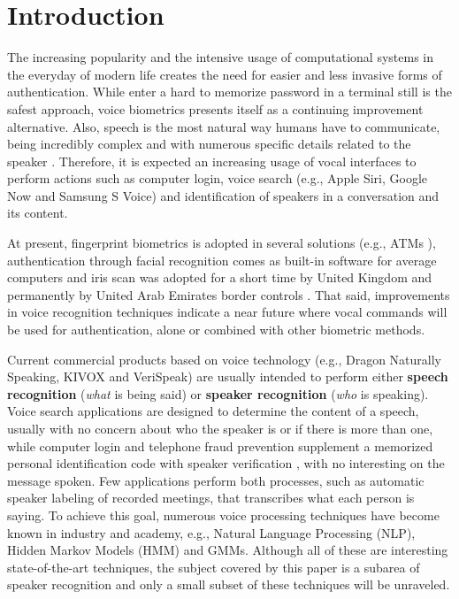 \chapter{Introduction}
\label{ch:intro}

The increasing popularity and the intensive usage of computational systems in the everyday of modern life creates the need for easier and less invasive forms of authentication. While enter a hard to memorize password in a terminal still is the safest approach, voice biometrics presents itself as a continuing improvement alternative. Also, speech is the most natural way humans have to communicate, being incredibly complex and with numerous specific details related to the speaker \cite{bimbot.et.al.2004}. Therefore, it is expected an increasing usage of vocal interfaces to perform actions such as computer login, voice search (e.g., Apple Siri, Google Now and Samsung S Voice) and identification of speakers in a conversation and its content.

At present, fingerprint biometrics is adopted in several solutions (e.g., ATMs \cite{wang.wu.2002}), authentication through facial recognition comes as built-in software for average computers and iris scan was adopted for a short time by United Kingdom and permanently by United Arab Emirates border controls \cite{sasse.2007, raisi.khouri.2008}. That said, improvements in voice recognition techniques indicate a near future where vocal commands will be used for authentication, alone or combined with other biometric methods.

Current commercial products based on voice technology (e.g., Dragon Naturally Speaking, KIVOX and VeriSpeak) are usually intended to perform either \textbf{speech recognition} (\emph{what} is being said) or \textbf{speaker recognition} (\emph{who} is speaking). Voice search applications are designed to determine the content of a speech, usually with no concern about who the speaker is or if there is more than one, while computer login and telephone fraud prevention supplement a memorized personal identification code with speaker verification \cite{reynolds.1995a}, with no interesting on the message spoken. Few applications perform both processes, such as automatic speaker labeling of recorded meetings, that transcribes what each person is saying. To achieve this goal, numerous voice processing techniques have become known in industry and academy, e.g., Natural Language Processing (NLP), Hidden Markov Models (HMM) and GMMs. Although all of these are interesting state-of-the-art techniques, the subject covered by this paper is a subarea of speaker recognition and only a small subset of these techniques will be unraveled.

